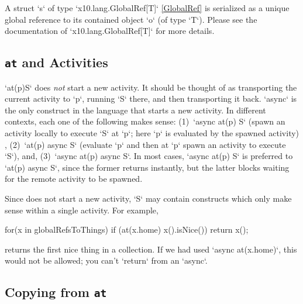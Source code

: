 A struct \xcd`s` of type \xcd`x10.lang.GlobalRef[T]` \ref{GlobalRef}
is serialized as a unique global reference to its contained object
\xcd`o` (of type \xcd`T`).  Please see the documentation
of \xcd`x10.lang.GlobalRef[T]` for more details.



\subsection{{\tt at} and Activities}
\xcd`at(p)S` 
does {\em not} start a new activity.  It should be thought of as
transporting the current activity to \xcd`p`, running \xcd`S` there, and then
transporting it back.  \xcd`async` is the only construct in the
language that starts a new activity. In different contexts, each one
of the following makes sense:
(1)~\xcd`async at(p) S` 
(spawn an activity locally to execute \xcd`S` at
\xcd`p`; here \xcd`p` is evaluated by the spawned activity) , 
(2)~\xcd`at(p) async S` 
(evaluate \xcd`p` and then at \xcd`p` spawn an
activity to execute \xcd`S`), and,
(3)~\xcd`async at(p) async S`. 
In most cases, \xcd`async at(p) S` is preferred to \xcd`at(p) async S`, since
the former returns instantly, but the latter blocks waiting for the remote
activity to be spawned. 

Since 
does not start a new activity, 
\xcd`S` may contain constructs which only make sense
within a single activity.  
For example, 
\begin{xten}
    for(x in globalRefsToThings) 
      if (at(x.home) x().isNice()) 
        return x();
\end{xten}
returns the first nice thing in a collection.   If we had used 
\xcd`async at(x.home)`, this would not be allowed; 
you can't \xcd`return` from an
\xcd`async`. 




\subsection{Copying from {\tt at} }

